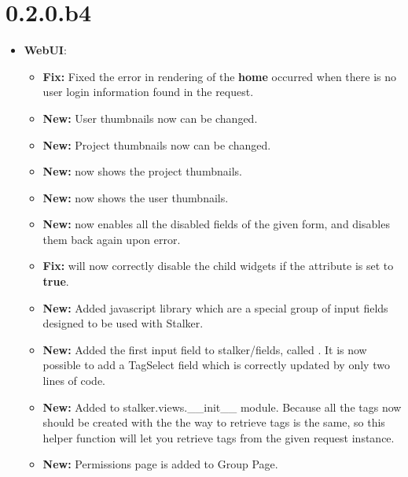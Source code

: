 \documentclass[a4paper,10pt,english]{sphinxmanual}
\begin{document}
\section{0.2.0.b4}
\label{changelog:b4}\begin{itemize}
\item {} 
\textbf{WebUI}:
\begin{itemize}
\item {} 
\textbf{Fix:} Fixed the error in rendering of the \textbf{home} occurred when there is no
user login information found in the request.

\item {} 
\textbf{New:} User thumbnails now can be changed.

\item {} 
\textbf{New:} Project thumbnails now can be changed.

\item {} 
\textbf{New:}  now shows the project thumbnails.

\item {} 
\textbf{New:}  now shows the user thumbnails.

\item {} 
\textbf{New:}  now enables all the disabled fields of the given
form, and disables them back again upon error.

\item {} 
\textbf{Fix:}  will now correctly disable the child widgets if the
 attribute is set to \textbf{true}.

\item {} 
\textbf{New:} Added  javascript library which are a special group of input
fields designed to be used with Stalker.

\item {} 
\textbf{New:} Added the first input field to stalker/fields, called . It
is now possible to add a TagSelect field which is correctly updated by only
two lines of code.

\item {} 
\textbf{New:} Added  to stalker.views.\_\_init\_\_ module. Because all the
tags now should be created with the  the way to retrieve tags
is the same, so this helper function will let you retrieve tags from the
given request instance.

\item {} 
\textbf{New:} Permissions page is added to Group Page.


\end{itemize}
\end{itemize}
\end{document}
